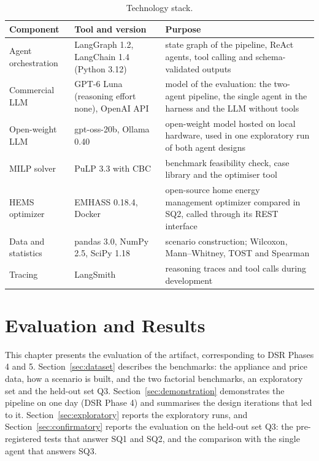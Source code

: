 \documentclass[12pt,a4paper]{report}
\begin{document}
\begin{table}[h!]
\caption{Technology stack.}
\label{tab:stack}
\small
\begin{tabularx}{\textwidth}{l>{\raggedright\arraybackslash}p{4.0cm}X}
\toprule
Component & Tool and version & Purpose \\
\midrule
Agent orchestration & LangGraph 1.2, LangChain 1.4 (Python 3.12) & state graph of the pipeline, ReAct agents, tool calling and schema-validated outputs \\[2pt]
Commercial LLM & GPT-6 Luna (reasoning effort none), OpenAI API & model of the evaluation: the two-agent pipeline, the single agent in the harness and the LLM without tools \\[2pt]
Open-weight LLM & gpt-oss-20b, Ollama 0.40 & open-weight model hosted on local hardware, used in one exploratory run of both agent designs \\[2pt]
MILP solver & PuLP 3.3 with CBC & benchmark feasibility check, case library and the optimiser tool \\[2pt]
HEMS optimizer & EMHASS 0.18.4, Docker & open-source home energy management optimizer compared in SQ2, called through its REST interface \\[2pt]
Data and statistics & pandas 3.0, NumPy 2.5, SciPy 1.18 & scenario construction; Wilcoxon, Mann--Whitney, TOST and Spearman \\[2pt]
Tracing & LangSmith & reasoning traces and tool calls during development \\
\bottomrule
\end{tabularx}
\end{table}

\chapter{Evaluation and Results}

This chapter presents the evaluation of the artifact, corresponding to
DSR Phases 4 and 5. Section~\ref{sec:dataset} describes the benchmarks:
the appliance and price data, how a scenario is built, and the two
factorial benchmarks, an exploratory set and the held-out set Q3.
Section~\ref{sec:demonstration} demonstrates the pipeline on one day
(DSR Phase 4) and summarises the design iterations that led to it.
Section~\ref{sec:exploratory} reports the exploratory runs, and
Section~\ref{sec:confirmatory} reports the evaluation on the held-out
set Q3: the pre-registered tests that answer SQ1 and SQ2, and the
comparison with the single agent that answers SQ3.
\end{document}

